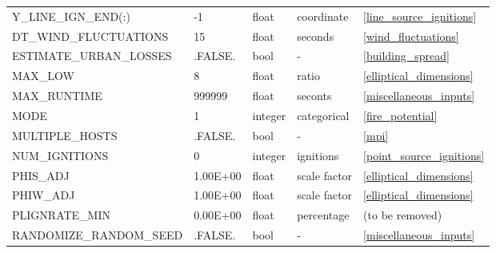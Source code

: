 \begin{landscape}
\begin{center}
\begin{longtable}{lllll}
Y\_LINE\_IGN\_END(:)                         & -1                         & float                  & coordinate                         & \ref{line_source_ignitions}          \\
DT\_WIND\_FLUCTUATIONS                       & 15                         & float                  & seconds                            & \ref{wind_fluctuations}              \\
ESTIMATE\_URBAN\_LOSSES                      & .FALSE.                    & bool                   & -                                  & \ref{building_spread}                \\
MAX\_LOW                                     & 8                          & float                  & ratio                              & \ref{elliptical_dimensions}          \\
MAX\_RUNTIME                                 & 999999                     & float                  & seconts                            & \ref{miscellaneous_inputs}           \\
MODE                                         & 1                          & integer                & categorical                        & \ref{fire_potential}                 \\
MULTIPLE\_HOSTS                              & .FALSE.                    & bool                   & -                                  & \ref{mpi}                            \\
NUM\_IGNITIONS                               & 0                          & integer                & ignitions                          & \ref{point_source_ignitions}         \\
PHIS\_ADJ                                    & 1.00E+00                   & float                  & scale factor                       & \ref{elliptical_dimensions}          \\
PHIW\_ADJ                                    & 1.00E+00                   & float                  & scale factor                       & \ref{elliptical_dimensions}          \\
PLIGNRATE\_MIN                               & 0.00E+00                   & float                  & percentage                         & (to be removed)                      \\
RANDOMIZE\_RANDOM\_SEED                      & .FALSE.                    & bool                   & -                                  & \ref{miscellaneous_inputs}           \\

\end{longtable}
\end{center}
\end{landscape}
